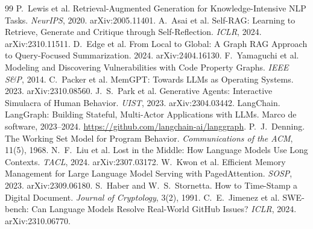 \documentclass[11pt]{article}
\begin{document}
\begin{thebibliography}{99}
 P.~Lewis et al. Retrieval-Augmented Generation for
Knowledge-Intensive NLP Tasks. \emph{NeurIPS}, 2020. arXiv:2005.11401.
 A.~Asai et al. Self-RAG: Learning to Retrieve, Generate
and Critique through Self-Reflection. \emph{ICLR}, 2024. arXiv:2310.11511.
 D.~Edge et al. From Local to Global: A Graph RAG
Approach to Query-Focused Summarization. 2024. arXiv:2404.16130.
 F.~Yamaguchi et al. Modeling and Discovering
Vulnerabilities with Code Property Graphs. \emph{IEEE S\&P}, 2014.
 C.~Packer et al. MemGPT: Towards LLMs as Operating
Systems. 2023. arXiv:2310.08560.
 J.~S.~Park et al. Generative Agents: Interactive
Simulacra of Human Behavior. \emph{UIST}, 2023. arXiv:2304.03442.
 LangChain. LangGraph: Building Stateful, Multi-Actor
Applications with LLMs. Marco de software, 2023--2024.
\url{https://github.com/langchain-ai/langgraph}.
 P.~J.~Denning. The Working Set Model for Program
Behavior. \emph{Communications of the ACM}, 11(5), 1968.
 N.~F.~Liu et al. Lost in the Middle: How Language Models Use
Long Contexts. \emph{TACL}, 2024. arXiv:2307.03172.
 W.~Kwon et al. Efficient Memory Management for Large
Language Model Serving with PagedAttention. \emph{SOSP}, 2023. arXiv:2309.06180.
 S.~Haber and W.~S.~Stornetta. How to Time-Stamp a
Digital Document. \emph{Journal of Cryptology}, 3(2), 1991.
 C.~E.~Jimenez et al. SWE-bench: Can Language Models
Resolve Real-World GitHub Issues? \emph{ICLR}, 2024. arXiv:2310.06770.
\end{thebibliography}
\end{document}
